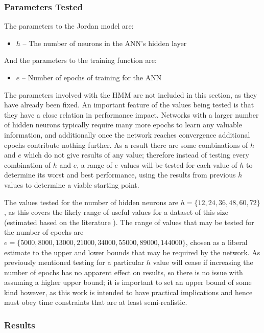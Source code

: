 \documentclass[ author={Stephen Livermore-Tozer},
				supervisor={Dr. Peter Flach},
				degree={MEng},
				title={Algorithmic Co-composition Using Machine Learning},
				subtitle={},
				type={research},
				year={2016} ]{dissertation}
\begin{document}
	\subsubsection{Parameters Tested}
	
	The parameters to the Jordan model are:
	\begin{itemize}
		\item $h$ -- The number of neurons in the ANN's hidden layer
	\end{itemize}
	And the parameters to the training function are:
	\begin{itemize}
		\item $e$ -- Number of epochs of training for the ANN
	\end{itemize}
	
	The parameters involved with the HMM are not included in this section, as they have already been fixed. An important feature of the values being tested is that they have a close relation in performance impact. Networks with a larger number of hidden neurons typically require many more epochs to learn any valuable information, and additionally once the network reaches convergence additional epochs contribute nothing further. As a result there are some combinations of $h$ and $e$ which do not give results of any value; therefore instead of testing every combination of $h$ and $e$, a range of $e$ values will be tested for each value of $h$ to determine its worst and best performance, using the results from previous $h$ values to determine a viable starting point. 
	
	The values tested for the number of hidden neurons are $h = \{12, 24, 36, 48, 60, 72\}$, as this covers the likely range of useful values for a dataset of this size (estimated based on the literature \cite{todd1989connectionist}). The range of values that may be tested for the number of epochs are $e = \{5000, 8000, 13000, 21000, 34000, 55000, 89000, 144000\}$, chosen as a liberal estimate to the upper and lower bounds that may be required by the network. As previously mentioned testing for a particular $h$ value will cease if increasing the number of epochs has no apparent effect on results, so there is no issue with assuming a higher upper bound; it is important to set an upper bound of some kind however, as this work is intended to have practical implications and hence must obey time constraints that are at least semi-realistic.
	
	\subsubsection{Results}
	
\end{document}
